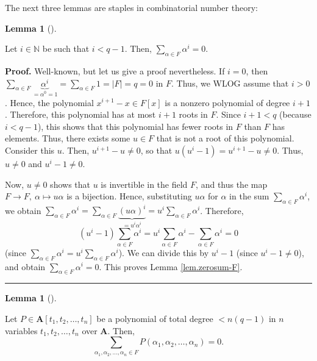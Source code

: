 \documentclass[numbers=enddot,12pt,final,onecolumn,notitlepage]{scrartcl}%
\numberwithin{exer}{section}
\theoremstyle{definition}
\newtheorem{lem}[theo]{Lemma}
\newenvironment{lemma}[1][]
{\begin{lem}[#1]\begin{leftbar}}
{\end{leftbar}\end{lem}}
\newenvironment{proof}[1][Proof]{\noindent\textbf{#1.} }{\ \rule{0.5em}{0.5em}}
\let\sumnonlimits\sum
\renewcommand{\sum}{\sumnonlimits\limits}
\theoremstyle{plainsl}
\begin{document}
The next three lemmas are staples in combinatorial number theory:

\begin{lemma}
\label{lem.zerosum-F}Let $i\in\mathbb{N}$ be such that $i<q-1$. Then,
$\sum_{\alpha\in F}\alpha^{i}=0$.
\end{lemma}

\begin{proof}
Well-known, but let us give a proof nevertheless. If $i=0$, then $\sum
_{\alpha\in F}\underbrace{\alpha^{i}}_{=\alpha^{0}=1}=\sum_{\alpha\in
F}1=\left\vert F\right\vert =q=0$ in $F$. Thus, we WLOG assume that $i>0$.
Hence, the polynomial $x^{i+1}-x\in F\left[  x\right]  $ is a nonzero
polynomial of degree $i+1$. Therefore, this polynomial has at most $i+1$ roots
in $F$. Since $i+1<q$ (because $i<q-1$), this shows that this polynomial has
fewer roots in $F$ than $F$ has elements. Thus, there exists some $u\in F$
that is not a root of this polynomial. Consider this $u$. Then, $u^{i+1}%
-u\neq0$, so that $u\left(  u^{i}-1\right)  =u^{i+1}-u\neq0$. Thus, $u\neq0$
and $u^{i}-1\neq0$.

Now, $u\neq0$ shows that $u$ is invertible in the field $F$, and thus the map
$F\rightarrow F,\ \alpha\mapsto u\alpha$ is a bijection. Hence, substituting
$u\alpha$ for $\alpha$ in the sum $\sum_{\alpha\in F}\alpha^{i}$, we obtain
$\sum_{\alpha\in F}\alpha^{i}=\sum_{\alpha\in F}\underbrace{\left(
u\alpha\right)  ^{i}}_{=u^{i}\alpha^{i}}=u^{i}\sum_{\alpha\in F}\alpha^{i}$.
Therefore,%
\[
\left(  u^{i}-1\right)  \sum_{\alpha\in F}\alpha^{i}=u^{i}\sum_{\alpha\in
F}\alpha^{i}-\sum_{\alpha\in F}\alpha^{i}=0
\]
(since $\sum_{\alpha\in F}\alpha^{i}=u^{i}\sum_{\alpha\in F}\alpha^{i}$). We
can divide this by $u^{i}-1$ (since $u^{i}-1\neq0$), and obtain $\sum
_{\alpha\in F}\alpha^{i}=0$. This proves Lemma \ref{lem.zerosum-F}.
\end{proof}

\begin{lemma}
\label{lem.cw-lema}Let $P\in\mathbf{A}\left[  t_{1},t_{2},\ldots,t_{n}\right]
$ be a polynomial of total degree $<n\left(  q-1\right)  $ in $n$ variables
$t_{1},t_{2},\ldots,t_{n}$ over $\mathbf{A}$. Then,%
\[
\sum_{\alpha_{1},\alpha_{2},\ldots,\alpha_{n}\in F}P\left(  \alpha_{1}%
,\alpha_{2},\ldots,\alpha_{n}\right)  =0.
\]

\end{lemma}
\end{document}
